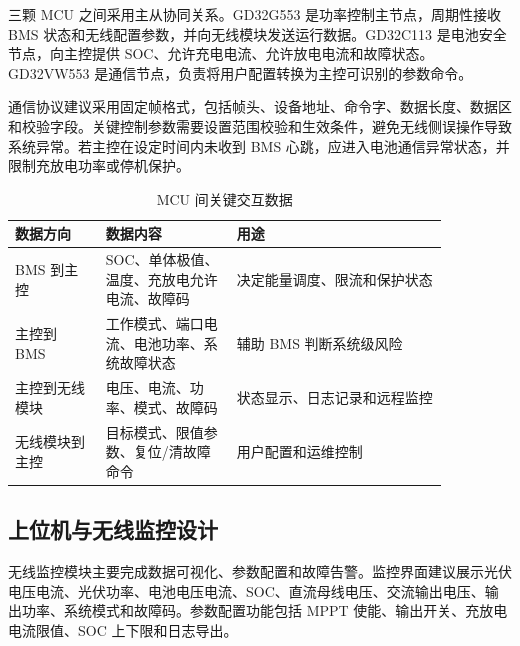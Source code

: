 三颗 MCU 之间采用主从协同关系。GD32G553 是功率控制主节点，周期性接收 BMS 状态和无线配置参数，并向无线模块发送运行数据。GD32C113 是电池安全节点，向主控提供 SOC、允许充电电流、允许放电电流和故障状态。GD32VW553 是通信节点，负责将用户配置转换为主控可识别的参数命令。

通信协议建议采用固定帧格式，包括帧头、设备地址、命令字、数据长度、数据区和校验字段。关键控制参数需要设置范围校验和生效条件，避免无线侧误操作导致系统异常。若主控在设定时间内未收到 BMS 心跳，应进入电池通信异常状态，并限制充放电功率或停机保护。

\begin{table}[htbp]
  \centering
  \caption{MCU 间关键交互数据}
  \label{tab:mcu_data}
  \begin{tabular}{|p{0.18\linewidth}|p{0.26\linewidth}|p{0.42\linewidth}|}
    \hline
    数据方向 & 数据内容 & 用途 \\
    \hline
    BMS 到主控 & SOC、单体极值、温度、充放电允许电流、故障码 & 决定能量调度、限流和保护状态 \\
    \hline
    主控到 BMS & 工作模式、端口电流、电池功率、系统故障状态 & 辅助 BMS 判断系统级风险 \\
    \hline
    主控到无线模块 & 电压、电流、功率、模式、故障码 & 状态显示、日志记录和远程监控 \\
    \hline
    无线模块到主控 & 目标模式、限值参数、复位/清故障命令 & 用户配置和运维控制 \\
    \hline
  \end{tabular}
\end{table}

\subsection{上位机与无线监控设计}

无线监控模块主要完成数据可视化、参数配置和故障告警。监控界面建议展示光伏电压电流、光伏功率、电池电压电流、SOC、直流母线电压、交流输出电压、输出功率、系统模式和故障码。参数配置功能包括 MPPT 使能、输出开关、充放电电流限值、SOC 上下限和日志导出。

